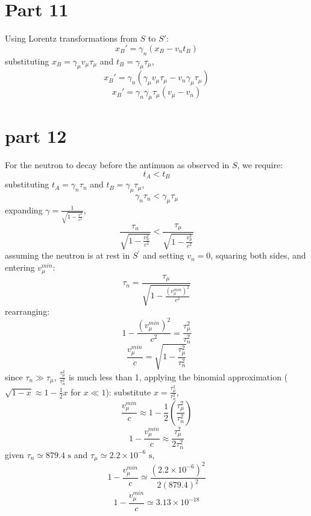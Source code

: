 \documentclass{article}
\begin{document}
\section{Part 11}
Using Lorentz transformations from $S$ to $S'$:
$$x_B' = \gamma_n (x_B - v_n t_B)$$
substituting $x_B = \gamma_\mu v_\mu \tau_\mu$ and $t_B = \gamma_\mu \tau_\mu$,
$$x_B' = \gamma_n (\gamma_\mu v_\mu \tau_\mu - v_n \gamma_\mu \tau_\mu)$$
$$x_B' = \gamma_n \gamma_\mu \tau_\mu (v_\mu - v_n)$$

\section{part 12}
For the neutron to decay before the antimuon as observed in $S$, we require:
$$t_A < t_B$$  
substituting $t_A = \gamma_n \tau_n$ and $t_B = \gamma_\mu \tau_\mu$,
$$\gamma_n \tau_n < \gamma_\mu \tau_\mu$$  
expanding $\gamma = \frac{1}{\sqrt{1 - \frac{v^2}{c^2}}}$,
$$\frac{\tau_n}{\sqrt{1 - \frac{v_n^2}{c^2}}} < \frac{\tau_\mu}{\sqrt{1 - \frac{v_\mu^2}{c^2}}}$$  
assuming the neutron is at rest in $S^{\prime}$ and setting $v_n = 0$, squaring both sides, and entering $v_\mu^{min}$:
$$\tau_n = \frac{\tau_\mu}{\sqrt{1 - \frac{(v_\mu^{min})^2}{c^2}}}$$
rearranging:
$$1 - \frac{(v_\mu^{min})^2}{c^2} = \frac{\tau_\mu^2}{\tau_n^2}$$  
$$\frac{v_\mu^{min}}{c} = \sqrt{1 - \frac{\tau_\mu^2}{\tau_n^2}}$$
since $\tau_n \gg \tau_\mu$, $\frac{\tau_\mu^2}{\tau_n^2}$ is much less than 1, applying the binomial approximation ($\sqrt{1 - x} \approx 1 - \frac{1}{2}x$ for $x \ll 1$):
substitute $x = \frac{\tau_\mu^2}{\tau_n^2}$,
$$\frac{v_\mu^{min}}{c} \approx 1 - \frac{1}{2}\left(\frac{\tau_\mu^2}{\tau_n^2}\right)$$
$$1 - \frac{v_\mu^{min}}{c} \approx \frac{\tau_\mu^2}{2\tau_n^2}$$
given $\tau_n \simeq 879.4 \text{ s}$ and $\tau_\mu \simeq 2.2 \times 10^{-6} \text{ s}$,
$$1 - \frac{v_\mu^{min}}{c} \simeq \frac{(2.2 \times 10^{-6})^2}{2(879.4)^2}$$
$$1 - \frac{v_\mu^{min}}{c} \simeq 3.13 \times 10^{-18}$$
\end{document}
